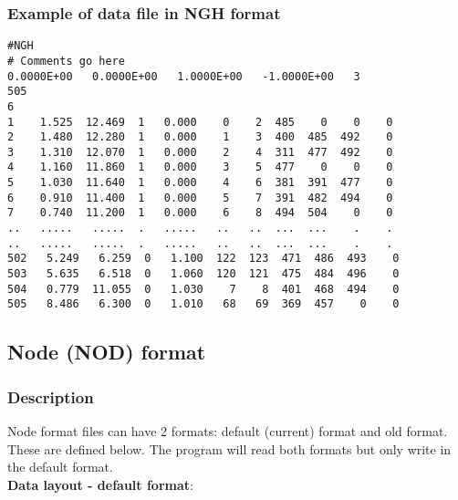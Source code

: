 \documentclass{article}
\begin{document}
\subsubsection[Example of data file in NGH format]{Example of data file in NGH format}
\begin{small}
\begin{lstlisting}
#NGH
# Comments go here
0.0000E+00   0.0000E+00   1.0000E+00   -1.0000E+00   3
505
6
1    1.525  12.469  1   0.000    0    2  485    0    0    0
2    1.480  12.280  1   0.000    1    3  400  485  492    0
3    1.310  12.070  1   0.000    2    4  311  477  492    0
4    1.160  11.860  1   0.000    3    5  477    0    0    0
5    1.030  11.640  1   0.000    4    6  381  391  477    0
6    0.910  11.400  1   0.000    5    7  391  482  494    0
7    0.740  11.200  1   0.000    6    8  494  504    0    0
..   .....   .....  .   .....   ..   ..  ...  ...    .    .
..   .....   .....  .   .....   ..   ..  ...  ...    .    .
502   5.249   6.259  0   1.100  122  123  471  486  493    0
503   5.635   6.518  0   1.060  120  121  475  484  496    0
504   0.779  11.055  0   1.030    7    8  401  468  494    0
505   8.486   6.300  0   1.010   68   69  369  457    0    0
\end{lstlisting}
\end{small}



\newpage
\subsection[Node (NOD) format]{Node (NOD) format}

\subsubsection[Description]{Description}

Node format files can have 2 formats: default (current) format and old format.
These are defined below. The program will read both formats but only write in the default format.\\

\textbf{Data layout - default format}: \\ 
\end{document}
